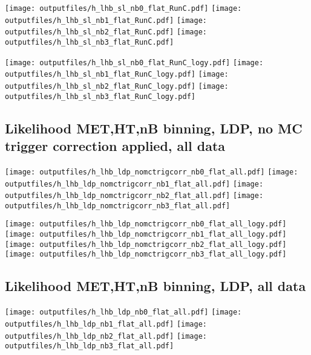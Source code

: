 \documentclass[11pt]{article}
\begin{document}
    \noindent
     \texttt{[image: outputfiles/h\_lhb\_sl\_nb0\_flat\_RunC.pdf]}
     \texttt{[image: outputfiles/h\_lhb\_sl\_nb1\_flat\_RunC.pdf]}
     \texttt{[image: outputfiles/h\_lhb\_sl\_nb2\_flat\_RunC.pdf]}
     \texttt{[image: outputfiles/h\_lhb\_sl\_nb3\_flat\_RunC.pdf]}

    \noindent
     \texttt{[image: outputfiles/h\_lhb\_sl\_nb0\_flat\_RunC\_logy.pdf]}
     \texttt{[image: outputfiles/h\_lhb\_sl\_nb1\_flat\_RunC\_logy.pdf]}
     \texttt{[image: outputfiles/h\_lhb\_sl\_nb2\_flat\_RunC\_logy.pdf]}
     \texttt{[image: outputfiles/h\_lhb\_sl\_nb3\_flat\_RunC\_logy.pdf]}

    \clearpage






    \subsection{ Likelihood MET,HT,nB binning, LDP, no MC trigger correction applied, all data}

    \noindent
     \texttt{[image: outputfiles/h\_lhb\_ldp\_nomctrigcorr\_nb0\_flat\_all.pdf]}
     \texttt{[image: outputfiles/h\_lhb\_ldp\_nomctrigcorr\_nb1\_flat\_all.pdf]}
     \texttt{[image: outputfiles/h\_lhb\_ldp\_nomctrigcorr\_nb2\_flat\_all.pdf]}
     \texttt{[image: outputfiles/h\_lhb\_ldp\_nomctrigcorr\_nb3\_flat\_all.pdf]}

    \noindent
     \texttt{[image: outputfiles/h\_lhb\_ldp\_nomctrigcorr\_nb0\_flat\_all\_logy.pdf]}
     \texttt{[image: outputfiles/h\_lhb\_ldp\_nomctrigcorr\_nb1\_flat\_all\_logy.pdf]}
     \texttt{[image: outputfiles/h\_lhb\_ldp\_nomctrigcorr\_nb2\_flat\_all\_logy.pdf]}
     \texttt{[image: outputfiles/h\_lhb\_ldp\_nomctrigcorr\_nb3\_flat\_all\_logy.pdf]}

   \clearpage

    \subsection{ Likelihood MET,HT,nB binning, LDP, all data}

    \noindent
     \texttt{[image: outputfiles/h\_lhb\_ldp\_nb0\_flat\_all.pdf]}
     \texttt{[image: outputfiles/h\_lhb\_ldp\_nb1\_flat\_all.pdf]}
     \texttt{[image: outputfiles/h\_lhb\_ldp\_nb2\_flat\_all.pdf]}
     \texttt{[image: outputfiles/h\_lhb\_ldp\_nb3\_flat\_all.pdf]}
\end{document}
